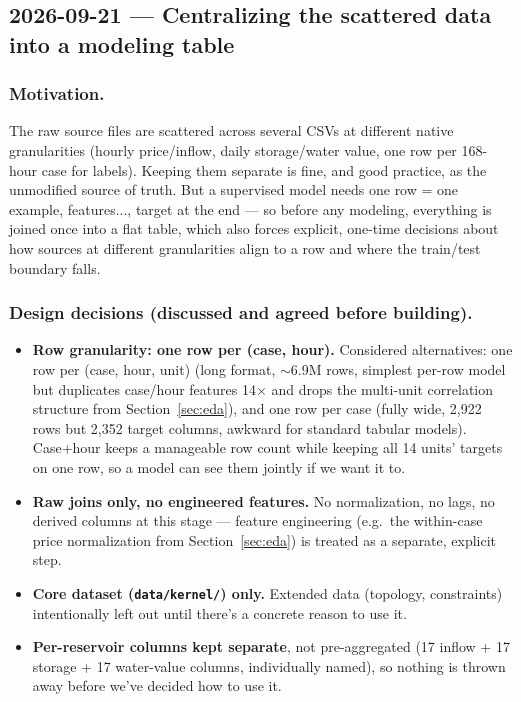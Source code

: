 \subsection{2026-09-21 --- Centralizing the scattered data into a modeling table}
\label{sec:modeling-table}

\subsubsection*{Motivation.} The raw source files are scattered across several CSVs at different
native granularities (hourly price/inflow, daily storage/water value, one row per 168-hour case
for labels). Keeping them separate is fine, and good practice, as the unmodified source of
truth. But a supervised model needs one row = one example, features..., target at the end ---
so before any modeling, everything is joined once into a flat table, which also forces explicit,
one-time decisions about how sources at different granularities align to a row and where the
train/test boundary falls.

\subsubsection*{Design decisions (discussed and agreed before building).}
\begin{itemize}
  \item \textbf{Row granularity: one row per (case, hour).} Considered alternatives: one row per
    (case, hour, unit) (long format, $\sim$6.9M rows, simplest per-row model but duplicates
    case/hour features 14$\times$ and drops the multi-unit correlation structure from
    Section~\ref{sec:eda}), and one row per case (fully wide, 2{,}922 rows but 2{,}352 target
    columns, awkward for standard tabular models). Case+hour keeps a manageable row count while
    keeping all 14 units' targets on one row, so a model can see them jointly if we want it to.
  \item \textbf{Raw joins only, no engineered features.} No normalization, no lags, no derived
    columns at this stage --- feature engineering (e.g.\ the within-case price normalization
    from Section~\ref{sec:eda}) is treated as a separate, explicit step.
  \item \textbf{Core dataset (\texttt{data/kernel/}) only.} Extended data (topology,
    constraints) intentionally left out until there's a concrete reason to use it.
  \item \textbf{Per-reservoir columns kept separate}, not pre-aggregated (17 inflow + 17 storage
    + 17 water-value columns, individually named), so nothing is thrown away before we've
    decided how to use it.
\end{itemize}

